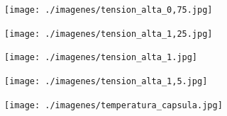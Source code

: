 \begin{center}
    \centering
    \texttt{[image: ./imagenes/tension\_alta\_0,75.jpg]}
\end{center}

\begin{center}
    \centering
    \texttt{[image: ./imagenes/tension\_alta\_1,25.jpg]}
\end{center}

\begin{center}
    \centering
    \texttt{[image: ./imagenes/tension\_alta\_1.jpg]}
\end{center}

\vspace{-0.4cm}

\begin{center}
    \centering
    \texttt{[image: ./imagenes/tension\_alta\_1,5.jpg]}
\end{center}

\begin{center}
    \centering
    \texttt{[image: ./imagenes/temperatura\_capsula.jpg]}
\end{center}


